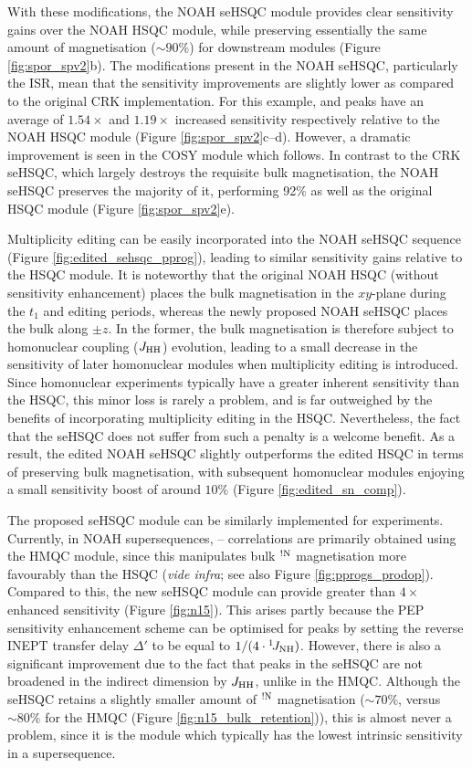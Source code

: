 \documentclass[11pt]{article}
\newcommand*{\proton}{\ce{^{1}H}}
\newcommand*{\nitrogen}{\ce{^{15}N}}
\newcommand*{\onejnh}{{}^{1}\!J_{\ce{NH}}}
\newcommand*{\magnnot}[1]{\ce{^1H}$^{!#1}$}
\newcommand*{\jhh}{J_{\ce{HH}}}
\newcommand*{\figref}[1]{Figure \ref{fig:#1}}
\begin{document}
With these modifications, the NOAH seHSQC module provides clear sensitivity gains over the NOAH HSQC module, while preserving essentially the same amount of \proton{} magnetisation ($\sim 90\%$) for downstream modules (\figref{spor_spv2}b).
The modifications present in the NOAH seHSQC, particularly the ISR, mean that the sensitivity improvements are slightly lower as compared to the original CRK implementation.
For this example,  and  peaks have an average of $1.54\times$ and $1.19\times$ increased sensitivity respectively relative to the NOAH HSQC module (\figref{spor_spv2}c--d).
However, a dramatic improvement is seen in the COSY module which follows.
In contrast to the CRK seHSQC, which largely destroys the requisite bulk magnetisation, the NOAH seHSQC preserves the majority of it, performing 92\% as well as the original HSQC module (\figref{spor_spv2}e).

Multiplicity editing can be easily incorporated into the NOAH seHSQC sequence (\figref{edited_sehsqc_pprog}), leading to similar sensitivity gains relative to the HSQC module.
It is noteworthy that the original NOAH HSQC (without sensitivity enhancement) places the bulk magnetisation in the $xy$-plane during the $t_1$ and editing periods, whereas the newly proposed NOAH seHSQC places the bulk along $\pm z$.
In the former, the bulk magnetisation is therefore subject to homonuclear coupling ($\jhh$) evolution, leading to a small decrease in the sensitivity of later homonuclear modules when multiplicity editing is introduced.
Since homonuclear experiments typically have a greater inherent sensitivity than the HSQC, this minor loss is rarely a problem, and is far outweighed by the benefits of incorporating multiplicity editing in the HSQC.
Nevertheless, the fact that the seHSQC does not suffer from such a penalty is a welcome benefit.
As a result, the edited NOAH seHSQC slightly outperforms the edited HSQC in terms of preserving bulk magnetisation, with subsequent homonuclear modules enjoying a small sensitivity boost of around $10\%$ (\figref{edited_sn_comp}).

The proposed seHSQC module can be similarly implemented for \nitrogen{} experiments.
Currently, in NOAH supersequences, \nitrogen{}--\proton{} correlations are primarily obtained using the HMQC module,\autocite{Kupce2007MRC, Kupce2017ACIE} since this manipulates bulk \magnnot{\ce{N}} magnetisation more favourably than the HSQC (\textit{vide infra}; see also \figref{pprogs_prodop}).
Compared to this, the new seHSQC module can provide greater than $4\times$ enhanced sensitivity (\figref{n15}).
This arises partly because the PEP sensitivity enhancement scheme can be optimised for  peaks by setting the reverse INEPT transfer delay $\Delta'$ to be equal to $1/(4 \cdot\onejnh)$.
However, there is also a significant improvement due to the fact that peaks in the \nitrogen{} seHSQC are not broadened in the indirect dimension by $\jhh$, unlike in the \nitrogen{} HMQC.
Although the seHSQC retains a slightly smaller amount of \magnnot{\ce{N}} magnetisation ($\sim 70\%$, versus $\sim 80\%$ for the HMQC (\figref{n15_bulk_retention})), this is almost never a problem, since it is the \nitrogen{} module which typically has the lowest intrinsic sensitivity in a supersequence.
\end{document}

